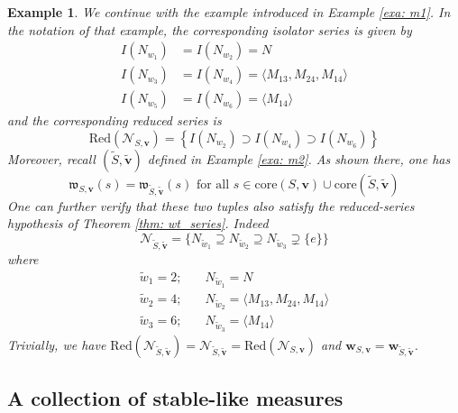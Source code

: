 \documentclass[pdflatex,sn-mathphys-num]{sn-jnl}%
\theoremstyle{thmstyleone}%
\theoremstyle{thmstyletwo}%
\newtheorem{exa}{Example}%
\theoremstyle{thmstylethree}%
\begin{document}
\begin{exa}
We continue with the example introduced in Example \ref{exa: m1}. In the notation of that example, the corresponding isolator series is given by
    \begin{align*}
        I(N_{w_1}) &=  I(N_{w_2}) = N \\
          I(N_{w_3}) &=   I(N_{w_4})= \langle M_{13}, M_{24}, M_{14}\rangle\\
    I(N_{w_5}) &=     I(N_{w_6}) =  \langle M_{14}\rangle
    \end{align*}
    and the corresponding reduced series is 
    $$\mbox{Red}(\mathcal{N}_{S,\mathbf{v}}) = \left\{  I(N_{w_2}) \supset   I(N_{w_4}) \supset    I(N_{w_6})   \right\}$$
Moreover, recall $(\tilde{S}, \tilde{\mathbf{v}})$ defined in Example \ref{exa: m2}. As shown there, one has
$$\mathfrak w_{S,\mathbf v}(s)=\mathfrak w_{\tilde{S},\tilde{\mathbf v}}(s)
\mbox{ for all } s\in \mbox{core}(S,\mathbf{v}) \cup \mbox{core}(\tilde{S}, \tilde{\mathbf{v}})$$  
One can further verify that these two tuples also satisfy the reduced-series hypothesis of Theorem \ref{thm: wt_series}. Indeed 
$$\mathcal{N}_{\tilde{S}, \tilde{\mathbf{v}}} =  \{N_{\tilde{w}_1} \supseteq N_{\tilde{w}_2} \supseteq N_{\tilde{w}_3} \supsetneq \{e\}\} $$
where 
\begin{align*}
    \tilde{w}_1 = 2; & \quad N_{\tilde{w}_1} = N\\
    \tilde{w}_2 = 4; & \quad N_{\tilde{w}_2}=\langle M_{13}, M_{24}, M_{14} \rangle \\  
    \tilde{w}_3 =  6; & \quad N_{\tilde{w}_3}= \langle M_{14}\rangle 
\end{align*}
Trivially, we have $\mbox{Red}(\mathcal{N}_{\tilde{S}, \tilde{\mathbf{v}}}) = \mathcal{N}_{\tilde{S}, \tilde{\mathbf{v}}}  = \mbox{Red}(\mathcal{N}_{S,\mathbf{v}})$ and $\mathbf{w}_{S, \mathbf v} = \mathbf{w}_{\tilde{S}, \tilde{\mathbf v}}$. 
\end{exa}



\subsection{A collection of stable-like measures}
\end{document}

